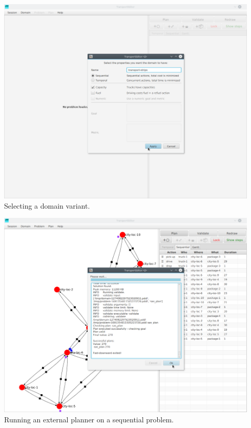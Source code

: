 \newpage

\begin{center}
\includegraphics[width=0.94\textwidth]{../img/transporteditor_dom-creat}
Selecting a domain variant.
\end{center}
\medskip

\begin{center}
\includegraphics[width=0.94\textwidth]{../img/transporteditor_planning}
Running an external planner on a sequential problem.
\end{center}
\medskip

